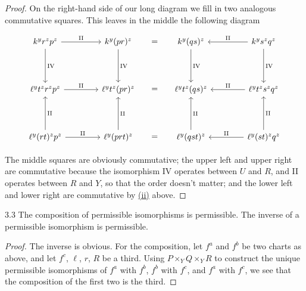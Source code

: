 \begin{proof}
On the right-hand side of our long diagram we fill in two analogous commutative squares. This leaves in the middle the following diagram

	\[
	\begin{tikzcd}[row sep=1.4cm, column sep=1.4cm]
		k^y r^z p^z \arrow[r, "\mathrm{II}"] \arrow[d, "\mathrm{IV}"] &
		k^y(pr)^z \arrow[r, phantom, "="] \arrow[d, "\mathrm{IV}"] &
		k^y(qs)^z \arrow[d, "\mathrm{IV}"] &
		k^y s^z q^z \arrow[l, "\mathrm{II}"'] \arrow[d, "\mathrm{IV}"] \\
		\ell^y t^z r^z p^z \arrow[r, "\mathrm{II}"] &
		\ell^y t^z(pr)^z \arrow[r, phantom, "="] &
		\ell^y t^z(qs)^z &
		\ell^y t^z s^z q^z \arrow[l, "\mathrm{II}"'] \\
		\ell^y(rt)^z p^z \arrow[r, "\mathrm{II}"] \arrow[u, "\mathrm{II}"'] &
		\ell^y(prt)^z \arrow[r, phantom, "="] \arrow[u, "\mathrm{II}"'] &
		\ell^y(qst)^z \arrow[u, "\mathrm{II}"'] &
		\ell^y(st)^z q^z \arrow[l, "\mathrm{II}"'] \arrow[u, "\mathrm{II}"']
	\end{tikzcd}
	\]

The middle squares are obviously commutative; the upper left and upper right are commutative because the isomorphism IV operates between $U$ and $R$, and II operates between $R$ and $Y$, so that the order doesn't matter; and the lower left and lower right are commutative by \hyperref[compat:6.2.ii]{(ii)} above.

\end{proof}

\begin{booklemma}{3.3}\label{lem:6.3.3}
The composition of permissible isomorphisms is permissible. The inverse of a permissible isomorphism is permissible.
\end{booklemma}

\begin{proof}
The inverse is obvious. For the composition, let $f^{a}$ and $f^{b}$ be two charts as above, and let $f^{c}$, $\ell$, $r$, $R$ be a third. Using $P\times_Y Q\times_Y R$ to construct the unique permissible isomorphisms of $f^{a}$ with $f^{b}$, $f^{b}$ with $f^{c}$, and $f^{a}$ with $f^{c}$, we see that the composition of the first two is the third.
\end{proof}

\par\endgroup

